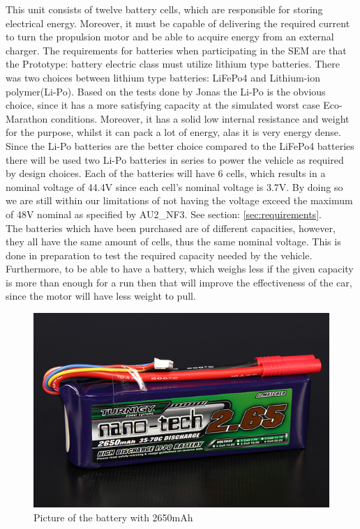 This unit consists of twelve battery cells, which are responsible for storing electrical energy. Moreover, it must be capable of delivering the required current to turn the propulsion motor and be able to acquire energy from an external charger.   
The requirements for batteries when participating in the SEM are that the Prototype: battery electric class must utilize lithium type batteries. There was two choices between lithium type batteries: LiFePo4 and Lithium-ion polymer(Li-Po). Based on the tests done by Jonas  the Li-Po is the obvious choice, since it has a more satisfying capacity at the simulated worst case Eco-Marathon conditions. Moreover, it has a solid low internal resistance and weight for the purpose, whilst it can pack a lot of energy, alas it is very energy dense.\\
Since the Li-Po batteries are the better choice compared to the LiFePo4 batteries there will be used two Li-Po batteries in series to power the vehicle as required by design choices. Each of the batteries will have 6 cells, which results in a nominal voltage of 44.4V since each cell's nominal voltage is 3.7V. By doing so we are still within our limitations of not having the voltage exceed the maximum of 48V nominal as specified by AU2\_NF3. See section: \ref{sec:requirements}.\\
The batteries which have been purchased are of different capacities, however, they all have the same amount of cells, thus the same nominal voltage. This is done in preparation to test the required capacity needed by the vehicle. Furthermore, to be able to have a battery, which weighs less if the given capacity is more than enough for a run then that will improve the effectiveness of the car, since the motor will have less weight to pull.\\

\begin{figure}[H]
	\centering
	\includegraphics[width=0.6\linewidth]{Hardware/Pictures/2650battery}
	\caption[Empty]{Picture of the battery with 2650mAh\footnotemark}
	\label{fig:2650battery}
\end{figure}

